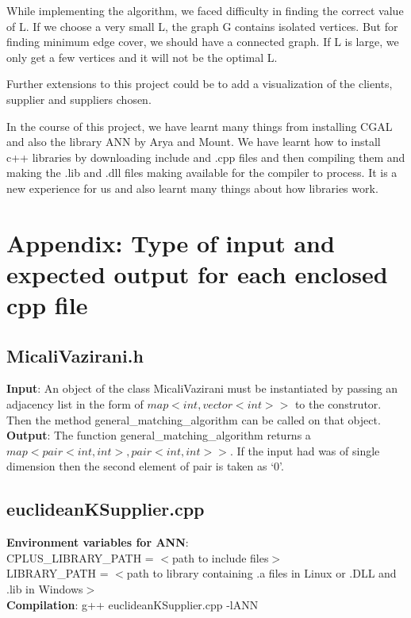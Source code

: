 \documentclass[12pt, a4paper]{article}
\begin{document}
{While implementing the algorithm, we faced difficulty in finding the correct value of L. If we choose a very small L, the graph G contains isolated vertices. But for finding minimum edge cover, we should have a connected graph. If L is large, we only get a few vertices and it will not be the optimal L.

Further extensions to this project could be to add a visualization of the clients, supplier and suppliers chosen.   

In the course of this project, we have learnt many things from installing CGAL and also the library ANN by Arya and Mount. We have learnt how to install c++ libraries by downloading include and .cpp files and then compiling them and making the .lib and .dll files making available for the compiler to process. It is a new experience for us and also learnt many things about how libraries work.

\section{Appendix: Type of input and expected output for each enclosed cpp file}
\subsection{MicaliVazirani.h}
\textbf{Input}: An object of the class MicaliVazirani must be instantiated by passing an adjacency list in the form of $map< int, vector<int>>$ to the construtor. Then the method general\_matching\_algorithm can be called on that object.\\

\textbf{Output}: The function general\_matching\_algorithm returns a $map<pair<int,int>,pair<int,int>>$. If the input had was of single dimension then the second element of pair is taken as `0'.

\subsection{euclideanKSupplier.cpp}
\textbf{Environment variables for ANN}: \\CPLUS\_LIBRARY\_PATH = $<$path to include files$>$\\
LIBRARY\_PATH = $<$path to library containing .a files in Linux or .DLL and .lib in Windows$>$\\

\textbf{Compilation}: g++ euclideanKSupplier.cpp -lANN\\

}
\end{document}
